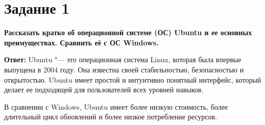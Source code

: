 \section{Задание 1}

\textbf{Рассказать кратко об операционной системе (ОС) Ubuntu и ее основных преимуществах. Сравнить её с ОС Windows.}

\textbf{Ответ:}
Ubuntu "--- это операционная система Linux, которая была впервые выпущена в 2004 году. Она известна своей стабильностью, безопасностью и открытостью. Ubuntu имеет простой и интуитивно понятный интерфейс, который делает ее подходящей для пользователей всех уровней навыков.

В сравнении с Windows, Ubuntu имеет более низкую стоимость, более длительный цикл обновлений и более низкое потребление ресурсов.
